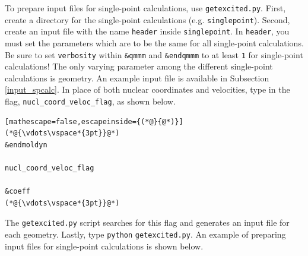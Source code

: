 \documentclass[letterpaper,12pt,titlepage]{article}
\begin{document}
To prepare input files for single-point calculations, use \verb+getexcited.py+.  First, create a directory for the single-point calculations (e.g. \verb+singlepoint+).  Second, create an input file with the name \verb+header+ inside \verb+singlepoint+.  In \verb+header+, you must set the parameters which are to be the same for all single-point calculations.  Be sure to set \verb+verbosity+ within \verb+&qmmm+ and \verb+&endqmmm+ to at least \verb+1+ for single-point calculations!  The only varying parameter among the different single-point calculations is geometry.  An example input file is available in Subsection \ref{input_spcalc}.  In place of both nuclear coordinates and velocities, type in the flag, \verb+nucl_coord_veloc_flag+, as shown below.
\begin{lstlisting}[mathescape=false,escapeinside={(*@}{@*)}]
(*@{\vdots\vspace*{3pt}}@*)
&endmoldyn

nucl_coord_veloc_flag

&coeff
(*@{\vdots\vspace*{3pt}}@*)
\end{lstlisting}
The \verb+getexcited.py+ script searches for this flag and generates an input file for each geometry.  Lastly, type \verb+python+ \verb+getexcited.py+.  An example of preparing input files for single-point calculations is shown below.
\newline
\end{document}

